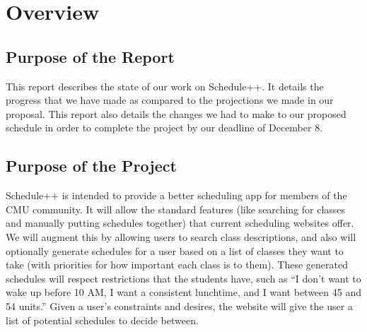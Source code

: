 \section{Overview}
\subsection{Purpose of the Report}
  This report describes the state of our work on Schedule++. It details the
  progress that we have made as compared to the projections we made in our
  proposal. This report also details the changes we had to make to our proposed
  schedule in order to complete the project by our deadline of December 8.

\subsection{Purpose of the Project}
  Schedule++ is intended to provide a better scheduling app for members of the
  CMU community. It will allow the standard features (like searching
  for classes and manually putting schedules together) that current scheduling
  websites offer. We will augment this by allowing users to search class
  descriptions, and also will optionally generate schedules for a user based
  on a list of classes they want to take (with priorities for how important
  each class is to them). These generated schedules will respect restrictions
  that the students have, such as ``I don't want to wake up before 10 AM, I want
  a consistent lunchtime, and I want between 45 and 54 units.''
  Given a user's constraints and desires, the website will give the user a list
  of potential schedules to decide between.

